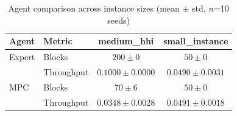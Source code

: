 \begin{table}[ht]
\centering
\caption{Agent comparison across instance sizes (mean $\pm$ std, $n$=10 seeds)}
\label{tab:statistical_comparison}
\begin{tabular}{llcc}
\toprule
Agent & Metric & medium_hhi & small_instance \\
\midrule
Expert & Blocks & $200 \pm 0$ & $50 \pm 0$ \\
 & Throughput & $0.1000 \pm 0.0000$ & $0.0490 \pm 0.0031$ \\
\midrule
MPC & Blocks & $70 \pm 6$ & $50 \pm 0$ \\
 & Throughput & $0.0348 \pm 0.0028$ & $0.0491 \pm 0.0018$ \\
\bottomrule
\end{tabular}
\end{table}